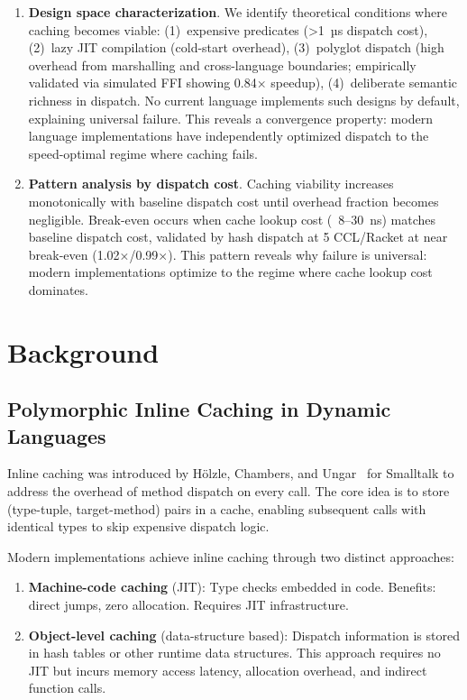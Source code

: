 \documentclass[sigplan,final,acmsmall,review,screen]{acmart}
\begin{document}
\begin{enumerate}
  \item \textbf{Design space characterization}. We identify theoretical conditions where caching becomes viable: (1)~expensive predicates (>1~µs dispatch cost),
    (2)~lazy JIT compilation (cold-start overhead), (3)~polyglot dispatch (high overhead from marshalling and cross-language boundaries; empirically validated via simulated FFI showing 0.84× speedup),
    (4)~deliberate semantic richness in dispatch. No current language implements such designs by default, explaining universal failure. This reveals a convergence property: modern language implementations
    have independently optimized dispatch to the speed-optimal regime where caching fails.

  \item \textbf{Pattern analysis by dispatch cost}. Caching viability increases monotonically with baseline dispatch cost until overhead fraction becomes
    negligible. Break-even occurs when cache lookup cost (~8--30~ns) matches baseline dispatch cost, validated by hash dispatch at 5%
    CCL/Racket at near break-even (1.02×/0.99×). This pattern reveals why failure is universal: modern implementations optimize to the regime
    where cache lookup cost dominates.
\end{enumerate}

\section{Background}

\subsection{Polymorphic Inline Caching in Dynamic Languages}

Inline caching was introduced by Hölzle, Chambers, and Ungar~\cite{hoelzle1991optimizing}
for Smalltalk to address the overhead of method dispatch on every call. The core idea is to
store (type-tuple, target-method) pairs in a cache, enabling subsequent calls with identical
types to skip expensive dispatch logic.

Modern implementations achieve inline caching through two distinct approaches:

\begin{enumerate}
  \item \textbf{Machine-code caching} (JIT): Type checks embedded in code. Benefits: direct
    jumps, zero allocation. Requires JIT infrastructure.

  \item \textbf{Object-level caching} (data-structure based): Dispatch information is stored
    in hash tables or other runtime data structures. This approach requires no JIT but incurs
    memory access latency, allocation overhead, and indirect function calls.
\end{enumerate}
\end{document}
